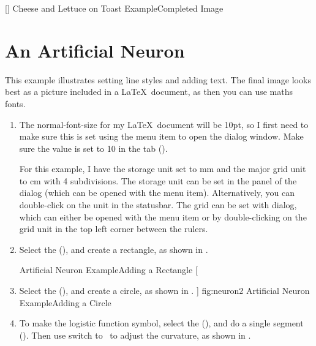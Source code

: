 []
{}
{Cheese and Lettuce on Toast Example\dash Completed Image}

\section{An Artificial Neuron}\label{sec:neuronexample}

This example illustrates setting line styles and adding text.
The final image looks best as a  picture included
in a \LaTeX\ document, as then you can use maths fonts.

\begin{enumerate}
\item The \gls{normal-font-size} for my \LaTeX\ document will be
10\gls{pt}, so I first need to make sure this is set using the
 menu item to open the
 dialog window. Make sure the
 value is set to 10 in the
 tab ().

For this example, I have the storage unit set to mm and the major
grid unit to cm with 4 subdivisions. The storage unit can be set
in the  panel of the  dialog
(which can be opened with the  menu item).
Alternatively, you can double-click on the unit in the
\gls{statusbar}. The grid can be set with  dialog,
which can either be opened with the 
menu item or by double-clicking on the grid unit in the top left
corner between the \glspl{ruler}.

\item Select the  (),
and create a rectangle, as shown in .

{}
{Artificial Neuron Example\dash Adding a Rectangle}
[
  \item Select the  (),
  and create a circle, as shown in .
]
{fig:neuron2}
{}
{Artificial Neuron Example\dash Adding a Circle}

\item To make the logistic function symbol, select the
 (), and do a single
segment ().  Then use switch to
\editpathmode\ to adjust the curvature, as shown in
. 


\end{enumerate}
